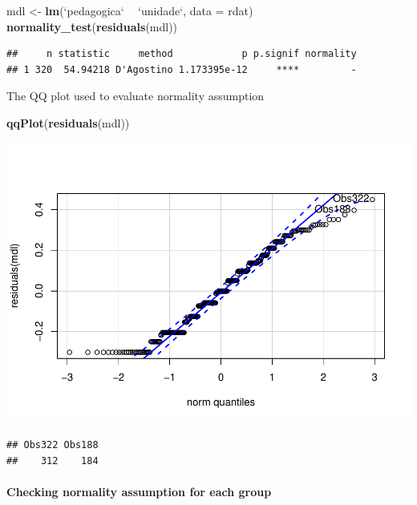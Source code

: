 \documentclass[]{article}
\newenvironment{Shaded}{\begin{snugshade}}{\end{snugshade}}
\newcommand{\DataTypeTok}[1]{\textcolor[rgb]{0.13,0.29,0.53}{#1}}
\newcommand{\KeywordTok}[1]{\textcolor[rgb]{0.13,0.29,0.53}{\textbf{#1}}}
\newcommand{\NormalTok}[1]{#1}
\newcommand{\OperatorTok}[1]{\textcolor[rgb]{0.81,0.36,0.00}{\textbf{#1}}}
\newcommand{\StringTok}[1]{\textcolor[rgb]{0.31,0.60,0.02}{#1}}
\let\oldparagraph\paragraph
\renewcommand{\paragraph}[1]{\oldparagraph{#1}\mbox{}}
\begin{document}
\begin{Shaded}
\begin{Highlighting}[]
\NormalTok{mdl <-}\StringTok{ }\KeywordTok{lm}\NormalTok{(}\StringTok{`}\DataTypeTok{pedagogica}\StringTok{`} \OperatorTok{~}\StringTok{ `}\DataTypeTok{unidade}\StringTok{`}\NormalTok{, }\DataTypeTok{data =}\NormalTok{ rdat)}
\KeywordTok{normality_test}\NormalTok{(}\KeywordTok{residuals}\NormalTok{(mdl))}
\end{Highlighting}
\end{Shaded}

\begin{verbatim}
##     n statistic     method            p p.signif normality
## 1 320  54.94218 D'Agostino 1.173395e-12     ****         -
\end{verbatim}

The QQ plot used to evaluate normality assumption

\begin{Shaded}
\begin{Highlighting}[]
\KeywordTok{qqPlot}\NormalTok{(}\KeywordTok{residuals}\NormalTok{(mdl))}
\end{Highlighting}
\end{Shaded}

\includegraphics{factorialAnova_files/figure-latex/unnamed-chunk-10-1.pdf}

\begin{verbatim}
## Obs322 Obs188 
##    312    184
\end{verbatim}

\hypertarget{checking-normality-assumption-for-each-group}{%
\paragraph{Checking normality assumption for each
group}\label{checking-normality-assumption-for-each-group}}
\end{document}
